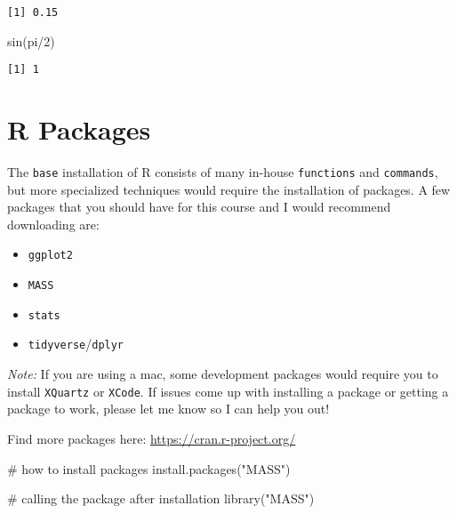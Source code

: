 \documentclass[
  letterpaper,
  DIV=11,
  numbers=noendperiod]{scrreprt}
\newenvironment{Shaded}{\begin{snugshade}}{\end{snugshade}}
\newcommand{\CommentTok}[1]{\textcolor[rgb]{0.37,0.37,0.37}{#1}}
\newcommand{\DecValTok}[1]{\textcolor[rgb]{0.68,0.00,0.00}{#1}}
\newcommand{\FunctionTok}[1]{\textcolor[rgb]{0.28,0.35,0.67}{#1}}
\newcommand{\NormalTok}[1]{\textcolor[rgb]{0.00,0.23,0.31}{#1}}
\newcommand{\SpecialCharTok}[1]{\textcolor[rgb]{0.37,0.37,0.37}{#1}}
\newcommand{\StringTok}[1]{\textcolor[rgb]{0.13,0.47,0.30}{#1}}
\begin{document}
\begin{verbatim}
[1] 0.15
\end{verbatim}

\begin{Shaded}
\begin{Highlighting}[]
\FunctionTok{sin}\NormalTok{(pi}\SpecialCharTok{/}\DecValTok{2}\NormalTok{)}
\end{Highlighting}
\end{Shaded}

\begin{verbatim}
[1] 1
\end{verbatim}

\section*{R Packages}\label{r-packages}


The \texttt{base} installation of R consists of many in-house
\texttt{functions} and \texttt{commands}, but more specialized
techniques would require the installation of packages. A few packages
that you should have for this course and I would recommend downloading
are:

\begin{itemize}
\item
  \texttt{ggplot2}
\item
  \texttt{MASS}
\item
  \texttt{stats}
\item
  \texttt{tidyverse}/\texttt{dplyr}
\end{itemize}

\emph{Note:} If you are using a mac, some development packages would
require you to install \texttt{XQuartz} or \texttt{XCode}. If issues
come up with installing a package or getting a package to work, please
let me know so I can help you out!

Find more packages here: \url{https://cran.r-project.org/}

\begin{Shaded}
\begin{Highlighting}[]
\CommentTok{\# how to install packages}
\FunctionTok{install.packages}\NormalTok{(}\StringTok{"MASS"}\NormalTok{)}
\end{Highlighting}
\end{Shaded}

\begin{Shaded}
\begin{Highlighting}[]
\CommentTok{\# calling the package after installation}
\FunctionTok{library}\NormalTok{(}\StringTok{"MASS"}\NormalTok{)}
\end{Highlighting}
\end{Shaded}
\end{document}

